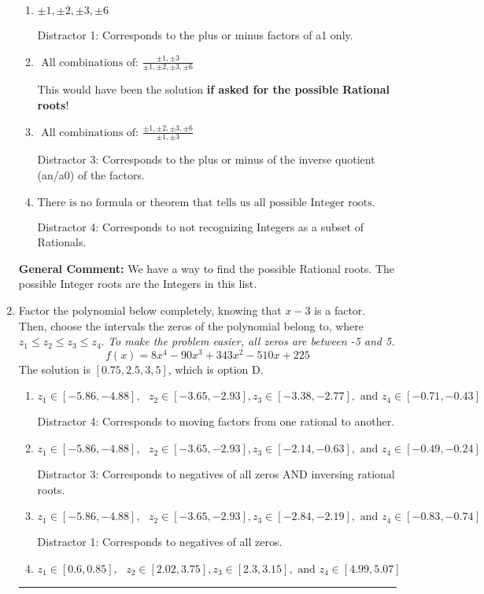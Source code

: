 \documentclass{extbook}[14pt]
\newcommand{\litem}[1]{\item #1

\rule{\textwidth}{0.4pt}}
\begin{document}
\begin{enumerate}
{\begin{enumerate}[label=\Alph*.]
* This is the solution \textbf{since we asked for the possible Integer roots}!
\item \( \pm 1,\pm 2,\pm 3,\pm 6 \)

 Distractor 1: Corresponds to the plus or minus factors of a1 only.
\item \( \text{ All combinations of: }\frac{\pm 1,\pm 3}{\pm 1,\pm 2,\pm 3,\pm 6} \)

This would have been the solution \textbf{if asked for the possible Rational roots}!
\item \( \text{ All combinations of: }\frac{\pm 1,\pm 2,\pm 3,\pm 6}{\pm 1,\pm 3} \)

 Distractor 3: Corresponds to the plus or minus of the inverse quotient (an/a0) of the factors. 
\item \( \text{There is no formula or theorem that tells us all possible Integer roots.} \)

 Distractor 4: Corresponds to not recognizing Integers as a subset of Rationals.
\end{enumerate}

\textbf{General Comment:} We have a way to find the possible Rational roots. The possible Integer roots are the Integers in this list.
}
\litem{
Factor the polynomial below completely, knowing that $x -3$ is a factor. Then, choose the intervals the zeros of the polynomial belong to, where $z_1 \leq z_2 \leq z_3 \leq z_4$. \textit{To make the problem easier, all zeros are between -5 and 5.}
\[ f(x) = 8x^{4} -90 x^{3} +343 x^{2} -510 x + 225 \]The solution is \( [0.75, 2.5, 3, 5] \), which is option D.\begin{enumerate}[label=\Alph*.]
\item \( z_1 \in [-5.86, -4.88], \text{   }  z_2 \in [-3.65, -2.93], z_3 \in [-3.38, -2.77], \text{   and   } z_4 \in [-0.71, -0.43] \)

 Distractor 4: Corresponds to moving factors from one rational to another.
\item \( z_1 \in [-5.86, -4.88], \text{   }  z_2 \in [-3.65, -2.93], z_3 \in [-2.14, -0.63], \text{   and   } z_4 \in [-0.49, -0.24] \)

 Distractor 3: Corresponds to negatives of all zeros AND inversing rational roots.
\item \( z_1 \in [-5.86, -4.88], \text{   }  z_2 \in [-3.65, -2.93], z_3 \in [-2.84, -2.19], \text{   and   } z_4 \in [-0.83, -0.74] \)

 Distractor 1: Corresponds to negatives of all zeros.
\item \( z_1 \in [0.6, 0.85], \text{   }  z_2 \in [2.02, 3.75], z_3 \in [2.3, 3.15], \text{   and   } z_4 \in [4.99, 5.07] \)


\end{enumerate}}
\end{enumerate}
\end{document}
